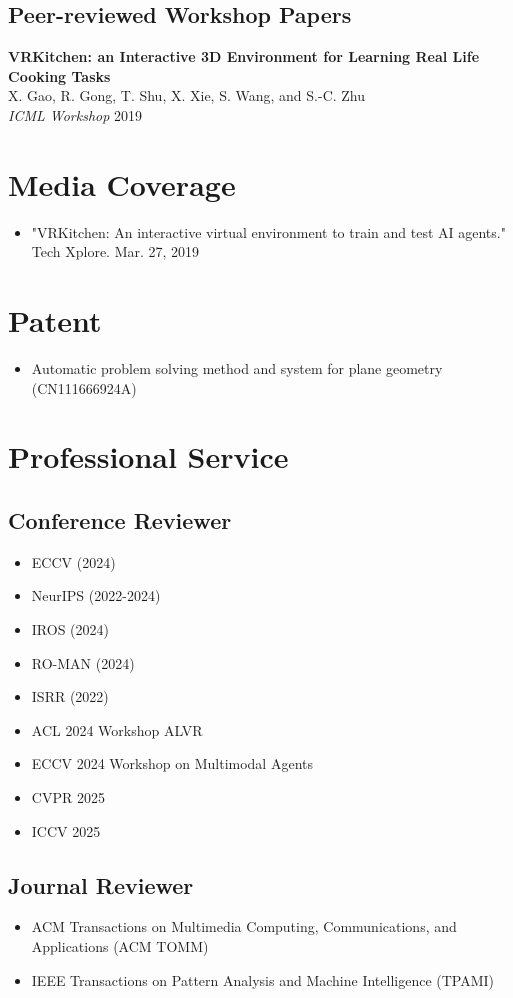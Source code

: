 \documentclass[11pt,a4paper]{article}
\newcommand{\publication}[4]{
  \textbf{#1} \\
  #2 \\
  \textit{#3} \hfill #4 \\
  \vspace{0.5em}
}
\begin{document}
\subsection*{Peer-reviewed Workshop Papers}
\publication{VRKitchen: an Interactive 3D Environment for Learning Real Life Cooking Tasks}{X. Gao, R. Gong, T. Shu, X. Xie, S. Wang, and S.-C. Zhu}{ICML Workshop}{2019}

\section*{Media Coverage}
\begin{itemize}[leftmargin=*]
\item "VRKitchen: An interactive virtual environment to train and test AI agents." Tech Xplore. Mar. 27, 2019
\end{itemize}

\section*{Patent}
\begin{itemize}[leftmargin=*]
\item Automatic problem solving method and system for plane geometry (CN111666924A)
\end{itemize}

\section*{Professional Service}
\subsection*{Conference Reviewer}
\begin{itemize}[leftmargin=*]
\item ECCV (2024)
\item NeurIPS (2022-2024)
\item IROS (2024)
\item RO-MAN (2024)
\item ISRR (2022)
\item ACL 2024 Workshop ALVR
\item ECCV 2024 Workshop on Multimodal Agents
\item CVPR 2025
\item ICCV 2025
\end{itemize}

\subsection*{Journal Reviewer}
\begin{itemize}[leftmargin=*]
\item ACM Transactions on Multimedia Computing, Communications, and Applications (ACM TOMM)
\item IEEE Transactions on Pattern Analysis and Machine Intelligence (TPAMI)
\end{itemize}
\end{document}

